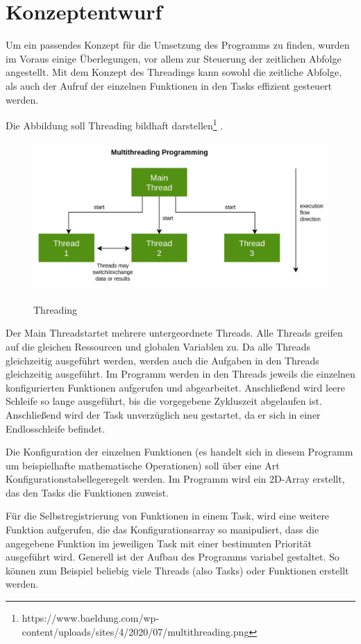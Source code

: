\chapter{Konzeptentwurf}
\label{cha:Konzeptentwurf}

Um ein passendes Konzept für die Umsetzung des Programms zu finden, wurden im Voraus einige Überlegungen, vor allem zur Steuerung der zeitlichen Abfolge angestellt.
Mit dem Konzept des Threadings kann sowohl die zeitliche Abfolge, als auch der Aufruf der einzelnen Funktionen in den Tasks effizient gesteuert werden. 

Die Abbildung  soll Threading bildhaft darstellen\footnote[1]{https://www.baeldung.com/wp-content/uploads/sites/4/2020/07/multithreading.png}	.

\begin{figure}[hbt]				%
	\centering						%
	\includegraphics[width=0.6\linewidth]{images/multithreading}	
	\label{fig:multithreading}
	\caption{Threading}
	{\raggedright
	 }
	
\end{figure}

Der \glqq Main Thread\grqq \space startet mehrere untergeordnete Threads. Alle Threads greifen auf die gleichen Ressourcen und globalen Variablen zu. 
Da alle Threads gleichzeitig ausgeführt werden, werden auch die Aufgaben in den Threads gleichzeitig ausgeführt.  
Im Programm werden in den Threads jeweils die einzelnen konfigurierten Funktionen aufgerufen und abgearbeitet. Anschließend wird leere Schleife so lange ausgeführt, bis die vorgegebene Zykluszeit abgelaufen ist. Anschließend wird der Task unverzüglich neu gestartet, da er sich in einer Endlosschleife befindet. 

Die Konfiguration der einzelnen Funktionen (es handelt sich in diesem Programm um beispielhafte mathematische Operationen) soll über eine Art \glqq Konfigurationstabelle\grqq\space geregelt werden. Im Programm wird ein 2D-Array erstellt, das den Tasks die Funktionen zuweist. 

Für die Selbstregistrierung von Funktionen in einem Task, wird eine weitere Funktion aufgerufen, die das Konfigurationsarray so manipuliert, dass die angegebene Funktion im jeweiligen Task mit einer bestimmten Priorität ausgeführt wird. 
Generell ist der Aufbau des Programms variabel gestaltet. So können zum Beispiel beliebig viele Threads (also Tasks) oder Funktionen erstellt werden. 

